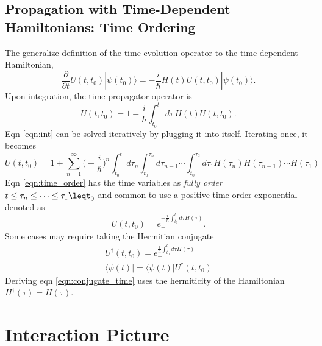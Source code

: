 \documentclass{article}
\begin{document}
\subsection{Propagation with Time-Dependent Hamiltonians: Time Ordering}

The generalize definition of the time-evolution operator to the time-dependent
Hamiltonian,
\begin{equation}
  \frac{\partial}{\partial t} U(t,t_0)|\psi(t_0)\rangle
  = - \frac{i}{\hbar}H(t)U(t,t_0)|\psi(t_0)\rangle.
  \label{eqn:time_int}
\end{equation}
Upon integration, the time propagator operator is
\begin{equation}
  U(t,t_0) = 1 - \frac{i}{\hbar}\int^t_{t_0}\,d\tau\,H(t)U(t,t_0).
  \label{eqn:int}
\end{equation}
Eqn \eqref{eqn:int} can be solved iteratively by plugging it into itself.
Iterating once, it becomes
\begin{equation}
  U(t,t_0) = 1 + \sum^{\infty}_{n=1}\Bigg(-\frac{i}{\hbar}\Bigg)^n
  \int^t_{t_0}d\tau_n\int^{\tau_n}_{t_0}d\tau_{n-1}\cdots\int^{\tau_2}_{t_0}
  d\tau_1H(\tau_n)H(\tau_{n-1})\cdots H(\tau_1)
  \label{eqn:time_order}
\end{equation}
Eqn \eqref{eqn:time_order} has the time variables as \textit{fully order}
$t\leq\tau_n\leq\cdots\leq\tau_1\leqt_0$ and common to use a positive time
order exponential denoted as
\begin{equation}
  U(t,t_0) = e_+^{-\frac{i}{\hbar}\int^t_{t_0}d\tau H(\tau)}.
  \label{eqn:pos_time}
\end{equation}
Some cases may require taking the Hermitian conjugate
\begin{align}
  U^{\dagger}(t,t_0) = e_-^{\frac{i}{\hbar}\int^t_{t_0}d\tau H(\tau)}
  \label{eqn:conjugate_time}\\
  \langle\psi(t)| = \langle\psi(t)|U^{\dagger}(t,t_0)
\end{align}
Deriving eqn \eqref{eqn:conjugate_time} uses the hermiticity of the Hamiltonian
$H^{\dagger}(\tau)=H(\tau)$.

\section{Interaction Picture}
\end{document}
